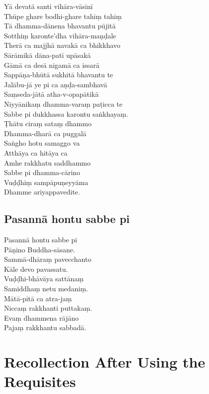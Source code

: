 Yā devatā santi vihāra-vāsinī\\
Thūpe ghare bodhi-ghare tahiṃ tahiṃ\\
Tā dhamma-dānena bhavantu pūjitā\\
Sotthiṃ karonte'dha vihāra-maṇḍale\\
Therā ca majjhā navakā ca bhikkhavo\\
Sārāmikā dāna-patī upāsakā\\
Gāmā ca desā nigamā ca issarā\\
Sappāṇa-bhūtā sukhitā bhavantu te\\
Jalābu-jā ye pi ca aṇḍa-sambhavā\\
Saṃseda-jātā atha-v-opapātikā\\
Niyyānikaṃ dhamma-varaṃ paṭicca te\\
Sabbe pi dukkhassa karontu saṅkhayaṃ.\\
Ṭhātu ciraṃ sataṃ dhammo\\
Dhamma-dharā ca puggalā\\
Saṅgho hotu samaggo va\\
Atthāya ca hitāya ca\\
Amhe rakkhatu saddhammo\\
Sabbe pi dhamma-cārino\\
Vuḍḍhiṃ sampāpuṇeyyāma\\
Dhamme ariyappavedite.

\subsection{Pasannā hontu sabbe pi}



Pasannā hontu sabbe pi\\
Pāṇino Buddha-sāsane.\\
Sammā-dhāraṃ pavecchanto\\
Kāle devo pavassatu.\\
Vuḍḍhi-bhāvāya sattānaṃ\\
Samiddhaṃ netu medaniṃ.\\
Mātā-pitā ca atra-jaṃ\\
Niccaṃ rakkhanti puttakaṃ.\\
Evaṃ dhammena rājāno\\
Pajaṃ rakkhantu sabbadā.


\section{Recollection After Using the Requisites}
\label{recollection-after-using}

